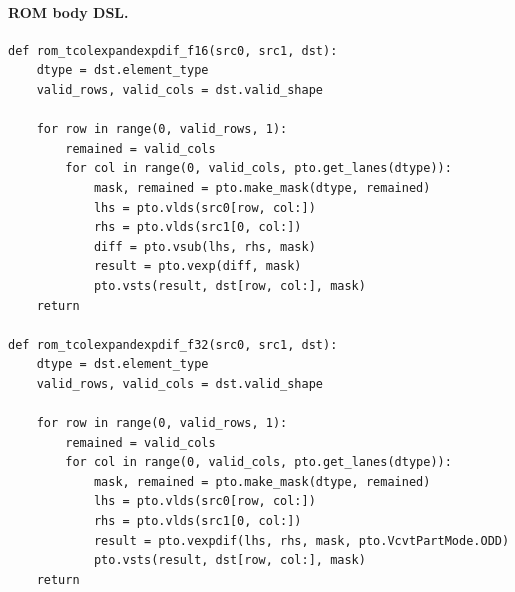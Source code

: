 \paragraph{ROM body DSL.}
\begin{lstlisting}[style=ptocode]
def rom_tcolexpandexpdif_f16(src0, src1, dst):
    dtype = dst.element_type
    valid_rows, valid_cols = dst.valid_shape

    for row in range(0, valid_rows, 1):
        remained = valid_cols
        for col in range(0, valid_cols, pto.get_lanes(dtype)):
            mask, remained = pto.make_mask(dtype, remained)
            lhs = pto.vlds(src0[row, col:])
            rhs = pto.vlds(src1[0, col:])
            diff = pto.vsub(lhs, rhs, mask)
            result = pto.vexp(diff, mask)
            pto.vsts(result, dst[row, col:], mask)
    return

def rom_tcolexpandexpdif_f32(src0, src1, dst):
    dtype = dst.element_type
    valid_rows, valid_cols = dst.valid_shape

    for row in range(0, valid_rows, 1):
        remained = valid_cols
        for col in range(0, valid_cols, pto.get_lanes(dtype)):
            mask, remained = pto.make_mask(dtype, remained)
            lhs = pto.vlds(src0[row, col:])
            rhs = pto.vlds(src1[0, col:])
            result = pto.vexpdif(lhs, rhs, mask, pto.VcvtPartMode.ODD)
            pto.vsts(result, dst[row, col:], mask)
    return
\end{lstlisting}
\Needspace{0.34\textheight}
